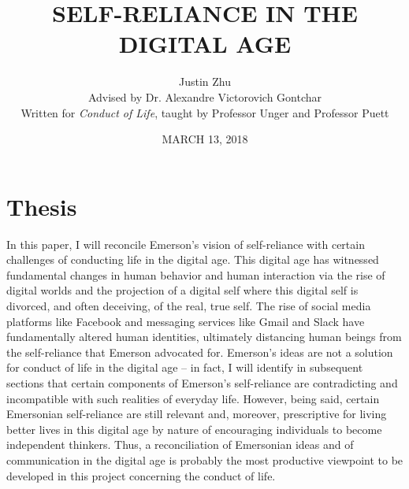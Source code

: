 \documentclass[12pt,letterpaper]{article}
\author{Justin Zhu \\ Advised by Dr. Alexandre Victorovich Gontchar \\ Written for \textit{Conduct of Life}, taught by Professor Unger and Professor Puett}
\title{SELF-RELIANCE IN THE DIGITAL AGE}
\date{MARCH 13, 2018}
\begin{document}
\pagestyle{empty}
\begin{titlepage}
\pagestyle{empty}
\maketitle
\pagestyle{empty}
\pagebreak
\tableofcontents
\end{titlepage}
\pagebreak
\pagestyle{plain}
\setcounter{page}{1}
\section{Thesis}

In this paper, I will reconcile Emerson's vision of
self-reliance with certain challenges of conducting life in the digital age.
This digital age has witnessed fundamental changes
in human behavior and human interaction via the rise of
digital worlds and the projection of a digital self where
this digital self is divorced, and often deceiving, of the real, true self.    The rise
of social media platforms like Facebook and messaging services like Gmail and Slack have fundamentally altered human identities, ultimately distancing human beings from the self-reliance that Emerson advocated for.  Emerson's ideas are not a solution for conduct of life in the digital age -- in fact, I will identify in subsequent sections that certain components of Emerson's self-reliance are contradicting and incompatible with such realities of everyday life.  However, being said, certain Emersonian self-reliance are still relevant and, moreover, prescriptive for living better lives in this digital age by nature of encouraging individuals to become independent thinkers.  Thus, a reconciliation of Emersonian ideas and of communication in the digital age is probably the most productive viewpoint to be developed in this project concerning the conduct of life.
\end{document}
